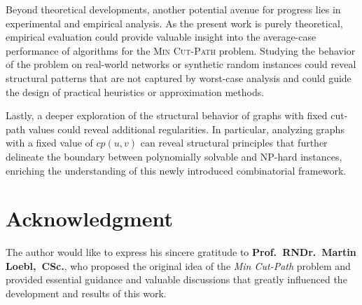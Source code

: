 \documentclass[journal ]{new-aiaa}
\numberwithin{equation}{section}
\theoremstyle{definition}
\theoremstyle{plain}
\theoremstyle{remark}
\begin{document}
Beyond theoretical developments, another potential avenue for progress lies in experimental and empirical analysis. As the present work is purely theoretical, empirical evaluation could provide valuable insight into the average-case performance of algorithms for the \textsc{Min Cut-Path} problem. Studying the behavior of the problem on real-world networks or synthetic random instances could reveal structural patterns that are not captured by worst-case analysis and could guide the design of practical heuristics or approximation methods.

Lastly, a deeper exploration of the structural behavior of graphs with fixed cut-path values could reveal additional regularities. In particular, analyzing graphs with a fixed value of \(cp(u,v)\) can reveal structural principles that further delineate the boundary between polynomially solvable and NP-hard instances, enriching the understanding of this newly introduced combinatorial framework.

\section*{Acknowledgment}

The author would like to express his sincere gratitude to \textbf{Prof.~RNDr.~Martin Loebl,~CSc.}, who proposed the original idea of the \emph{Min Cut-Path} problem and provided essential guidance and valuable discussions that greatly influenced the development and results of this work.



\end{document}
